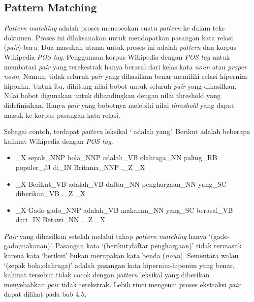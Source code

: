 \subsection{Pattern Matching}
\textit{Pattern matching} adalah proses mencocokan suatu \textit{pattern} ke dalam teks dokumen. Proses ini dilaksanakan untuk mendapatkan pasangan kata relasi (\textit{pair}) baru. Dua masukan utama untuk proses ini adalah \textit{pattern} dan korpus Wikipedia \textit{POS tag}. Penggunaan korpus Wikipedia dengan \textit{POS tag} untuk membatasi \textit{pair} yang terekestrak hanya berasal dari kelas kata \textit{noun} atau \textit{proper noun}. Namun, tidak seluruh \textit{pair} yang dihasilkan benar memiliki relasi hipernim-hiponim. Untuk itu, dihitung nilai bobot untuk seluruh \textit{pair} yang dihasilkan. Nilai bobot digunakan untuk dibandingkan dengan nilai threshold yang didefinisikan. Hanya \textit{pair} yang bobotnya melebihi nilai \textit{threshold} yang dapat masuk ke korpus pasangan kata relasi.

Sebagai contoh, terdapat \textit{pattern} leksikal `{\tagHyponym} adalah {\tagHypernym} yang'. Berikut adalah beberapa kalimat Wikipedia dengan \textit{POS tag}.

\begin{itemize}
  \item {\tagStart}\_X sepak\_NNP bola\_NNP adalah\_VB olahraga\_NN paling\_RB populer\_JJ di\_IN Britania\_NNP .\_Z {\tagEnd}\_X
  \item {\tagStart}\_X Berikut\_VB adalah\_VB daftar\_NN penghargaan\_NN yang\_SC diberikan\_VB .\_Z {\tagEnd}\_X
  \item {\tagStart}\_X Gado-gado\_NNP adalah\_VB makanan\_NN yang\_SC berasal\_VB dari\_IN Betawi\_NN .\_Z {\tagEnd}\_X
\end{itemize}

\textit{Pair} yang dihasilkan setelah melalui tahap \textit{pattern matching} hanya `(gado-gado;makanan)'. Pasangan kata `(berikut;daftar penghargaan)' tidak termasuk karena kata `berikut' bukan merupakan kata benda (\textit{noun}). Sementara walau `(sepak bola;olahraga)' adalah pasangan kata hipernim-hiponim yang benar, kalimat tersebut tidak cocok dengan \textit{pattern} leksikal yang diberikan menyebabkan \textit{pair} tidak terekstrak. Lebih rinci mengenai proses ekstraksi \textit{pair} dapat dilihat pada bab 4.5.

